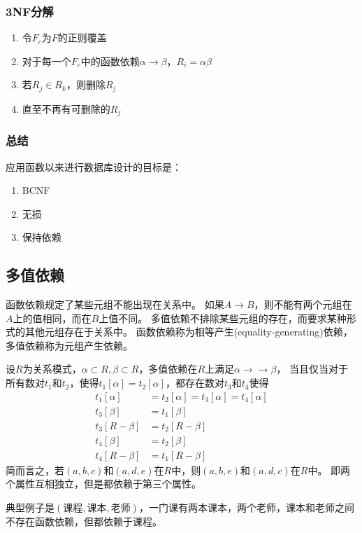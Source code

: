 \subsubsection{3NF分解}
\begin{enumerate}
	\item 令$F_c$为$F$的正则覆盖
	\item 对于每一个$F_c$中的函数依赖$\alpha\to\beta$，$R_i=\alpha\beta$
	\item 若$R_j\in R_k$，则删除$R_j$
	\item 直至不再有可删除的$R_j$
\end{enumerate}

\subsubsection{总结}
应用函数以来进行数据库设计的目标是：
\begin{enumerate}
	\item BCNF
	\item 无损
	\item 保持依赖
\end{enumerate}

\subsection{多值依赖}
函数依赖规定了某些元组不能出现在关系中。
如果$A\to B$，则不能有两个元组在$A$上的值相同，而在$B$上值不同。
多值依赖不排除某些元组的存在，而要求某种形式的其他元组存在于关系中。
函数依赖称为相等产生(equality-generating)依赖，多值依赖称为元组产生依赖。
\begin{definition}
设$R$为关系模式，$\alpha\subset R,\beta\subset R$，多值依赖在$R$上满足$\alpha\to\to\beta$，%
当且仅当对于所有数对$t_1$和$t_2$，使得$t_1[\alpha]=t_2[\alpha]$，都存在数对$t_3$和$t_4$使得
\[\begin{aligned}
\displaystyle t_{1}[\alpha ]&= t_{2}[\alpha ]=t_{3}[\alpha ]=t_{4}[\alpha ]\\
\displaystyle t_{3}[\beta ]&= t_{1}[\beta ]\\
\displaystyle t_{3}[R-\beta ]&= t_{2}[R-\beta ]\\
\displaystyle t_{4}[\beta ]&= t_{2}[\beta ]\\
\displaystyle t_{4}[R-\beta ]&= t_{1}[R-\beta ]
\end{aligned}\]
简而言之，若${\displaystyle (a,b,c)}$和${\displaystyle (a,d,e)}$在$R$中，则${\displaystyle (a,b,e)}$和${\displaystyle (a,d,c)}$在$R$中。
即两个属性互相独立，但是都依赖于第三个属性。
\begin{center}
\end{center}
典型例子是$(\text{课程},\text{课本},\text{老师})$，一门课有两本课本，两个老师，课本和老师之间不存在函数依赖，但都依赖于课程。
\end{definition}

